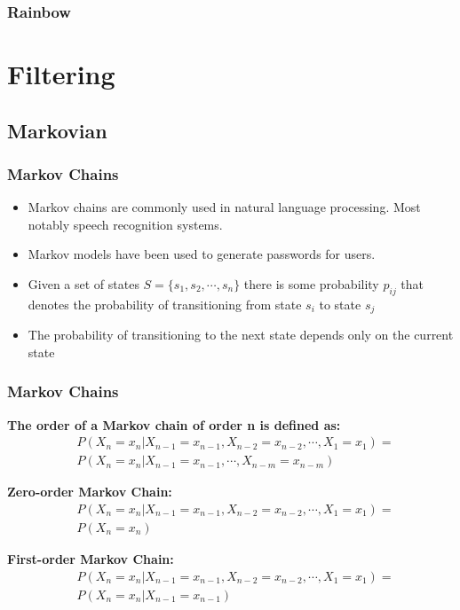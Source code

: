 \documentclass{beamer}
\begin{document}
\begin{frame}
\frametitle{Rainbow}
\end{frame}

\section{Filtering} 
\subsection{Markovian}

\begin{frame}
\frametitle{Markov Chains}
\begin{itemize}
\item Markov chains are commonly used in natural language processing. Most notably speech recognition systems.
\item Markov models have been used to generate passwords for users.
\item Given a set of states $S = \lbrace s_1,s_2,\dotsb,s_n \rbrace$ there is some probability $p_{ij}$ that denotes the probability of transitioning from state $s_i$ to state $s_j$
\item The probability of transitioning to the next state depends only on the current state
\end{itemize}
\end{frame}

\begin{frame}
\frametitle{Markov Chains}

\textbf{The order of a Markov chain of order n is defined as:}
\begin{align*}
& P(X_n = x_n | X_{n-1} = x_{n-1}, X_{n-2} = x_{n-2}, \dotsb , X_1 = x_1) = \\ & P(X_n = x_n | X_{n-1} = x_{n-1}, \dotsb , X_{n-m} = x_{n-m})
\end{align*}

\textbf{Zero-order Markov Chain:}
\begin{align*}
& P(X_n = x_n | X_{n-1} = x_{n-1}, X_{n-2} = x_{n-2}, \dotsb , X_1 = x_1) =  \\ & P(X_n = x_n)
\end{align*}

\textbf{First-order Markov Chain:}
\begin{align*}
& P(X_n = x_n | X_{n-1} = x_{n-1}, X_{n-2} = x_{n-2}, \dotsb , X_1 = x_1) = \\ & P(X_n = x_n | X_{n-1} = x_{n-1})
\end{align*}
\end{frame}
\end{document}
